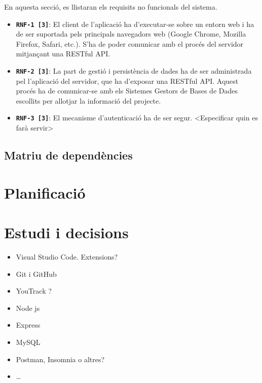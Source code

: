 \documentclass[a4paper,12pt]{ThesisStyle}
\begin{document}
En aquesta secció, es llistaran els requisits no funcionals del sistema.

\begin{itemize}
  \item \texttt{\textbf{RNF-1 [3]}}: El client de l'aplicació ha d'executar-se sobre un entorn web i ha de ser suportada pels principals navegadors web (Google Chrome, Mozilla Firefox, Safari, etc.). S'ha de poder comunicar amb el procés del servidor mitjançant una RESTful API.
  \item \texttt{\textbf{RNF-2 [3]}}: La part de gestió i persistència de dades ha de ser administrada pel l'aplicació del servidor, que ha d'exposar una RESTful API. Aquest procés ha de comunicar-se amb els Sistemes Gestors de Bases de Dades escollits per allotjar la informació del projecte.
  \item \texttt{\textbf{RNF-3 [3]}}: El mecanisme d'autenticació ha de ser segur. <Especificar quin es farà servir>
\end{itemize}


\section{Matriu de dependències}
\label{sec:matriu_dependencies}


\chapter{Planificació}  %
\label{cap:planificacio}



\chapter{Estudi i decisions}
\label{cap:estudi}

\begin{itemize}
  \item Visual Studio Code. Extensions?
  \item Git i GitHub
  \item YouTrack ?
  \item Node js
  \item Express
  \item MySQL
  \item Postman, Insomnia o altres?
  \item \ldots
\end{itemize}
\end{document}
